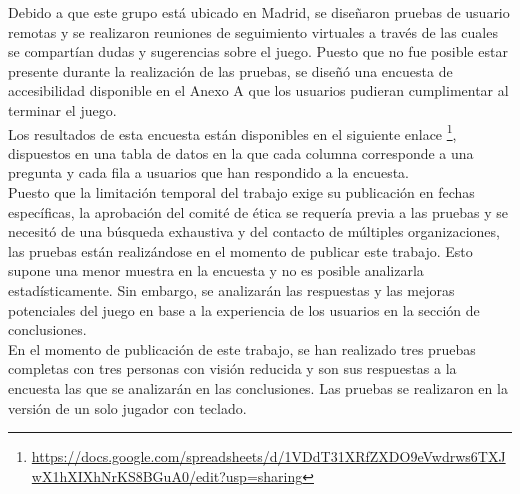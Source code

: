 Debido a que este grupo está ubicado en Madrid, se diseñaron pruebas de usuario remotas y se realizaron reuniones de seguimiento virtuales a través de las cuales se compartían dudas y sugerencias sobre el juego. Puesto que no fue posible estar presente durante la realización de las pruebas, se diseñó una encuesta de accesibilidad disponible en el Anexo A que los usuarios pudieran cumplimentar al terminar el juego. \\

Los resultados de esta encuesta están disponibles en el siguiente enlace \footnote{\url{https://docs.google.com/spreadsheets/d/1VDdT31XRfZXDO9eVwdrws6TXJwX1hXIXhNrKS8BGuA0/edit?usp=sharing}}, dispuestos en una tabla de datos en la que cada columna corresponde a una pregunta y cada fila a usuarios que han respondido a la encuesta. \\

Puesto que la limitación temporal del trabajo exige su publicación en fechas específicas, la aprobación del comité de ética se requería previa a las pruebas y se necesitó de una búsqueda exhaustiva y del contacto de múltiples organizaciones, las pruebas están realizándose en el momento de publicar este trabajo. Esto supone una menor muestra en la encuesta y no es posible analizarla estadísticamente. Sin embargo, se analizarán las respuestas y las mejoras potenciales del juego en base a la experiencia de los usuarios en la sección de conclusiones. \\

En el momento de publicación de este trabajo, se han realizado tres pruebas completas con tres personas con visión reducida y son sus respuestas a la encuesta las que se analizarán en las conclusiones. Las pruebas se realizaron en la versión de un solo jugador con teclado.\\

